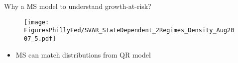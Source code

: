 \documentclass[xcolor=dvipsnames, xcolor=table, 10pt]{beamer}
\begin{document}
\begin{frame}{Why a MS model to understand growth-at-risk?}
 \begin{figure}
   \texttt{[image: FiguresPhillyFed/SVAR\_StateDependent\_2Regimes\_Density\_Aug2007\_5.pdf]}
  \end{figure}
\begin{itemize}
\item MS can match distributions from QR model
\end{itemize}
\end{frame}
\end{document}
